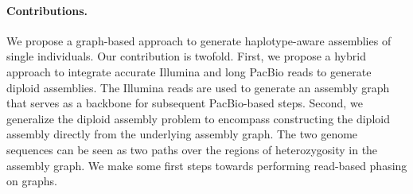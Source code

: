 \paragraph{Contributions.}
We propose a graph-based approach to generate haplotype-aware assemblies of single individuals.
Our contribution is twofold. First, we propose a hybrid approach to integrate accurate Illumina and long PacBio reads to generate diploid assemblies. 
The Illumina reads are used to generate an assembly graph that serves as a backbone for subsequent PacBio-based steps.
Second, we generalize the diploid assembly problem to encompass constructing the diploid assembly directly from the underlying assembly graph.
The two genome sequences can be seen as two paths over the regions of heterozygosity in the assembly graph.
We make some first steps towards performing read-based phasing on graphs.


